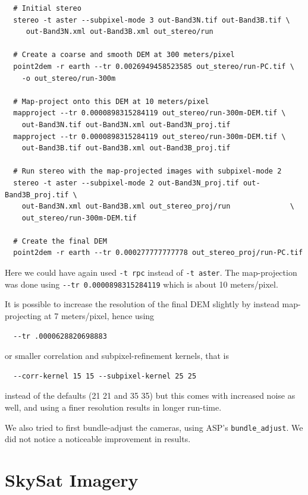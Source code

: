 \begin{verbatim}
  # Initial stereo
  stereo -t aster --subpixel-mode 3 out-Band3N.tif out-Band3B.tif \
     out-Band3N.xml out-Band3B.xml out_stereo/run               

  # Create a coarse and smooth DEM at 300 meters/pixel
  point2dem -r earth --tr 0.0026949458523585 out_stereo/run-PC.tif \
    -o out_stereo/run-300m

  # Map-project onto this DEM at 10 meters/pixel
  mapproject --tr 0.0000898315284119 out_stereo/run-300m-DEM.tif \
    out-Band3N.tif out-Band3N.xml out-Band3N_proj.tif            
  mapproject --tr 0.0000898315284119 out_stereo/run-300m-DEM.tif \
    out-Band3B.tif out-Band3B.xml out-Band3B_proj.tif            
  
  # Run stereo with the map-projected images with subpixel-mode 2
  stereo -t aster --subpixel-mode 2 out-Band3N_proj.tif out-Band3B_proj.tif \
    out-Band3N.xml out-Band3B.xml out_stereo_proj/run              \
    out_stereo/run-300m-DEM.tif

  # Create the final DEM
  point2dem -r earth --tr 0.000277777777778 out_stereo_proj/run-PC.tif
\end{verbatim}

Here we could have again used \texttt{-t rpc} instead of \texttt{-t aster}.
The map-projection was done using \texttt{-\/-tr 0.0000898315284119}
which is about 10 meters/pixel.

It is possible to increase the resolution of the final DEM slightly
by instead map-projecting at 7 meters/pixel, hence using

\begin{verbatim}
  --tr .0000628820698883
\end{verbatim}

or smaller correlation and subpixel-refinement kernels, that is

\begin{verbatim}
  --corr-kernel 15 15 --subpixel-kernel 25 25
\end{verbatim}

instead of the defaults (21 21 and 35 35) but this comes with increased noise as well, and
using a finer resolution results in longer run-time.

We also tried to first bundle-adjust the cameras, using ASP's \texttt{bundle\_adjust}.
We did not notice a noticeable improvement in results. 

\section{SkySat Imagery}
\label{sec:skysat}

